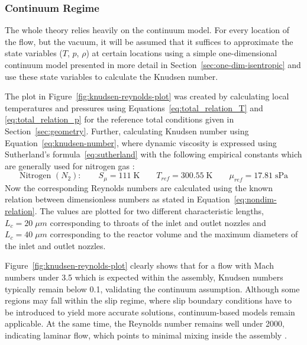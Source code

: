 \subsubsection*{Continuum Regime}
	The whole theory relies heavily on the continuum model.
	For every location of the flow, but the vacuum, it will be assumed that it suffices to approximate the state variables ($T$, $p$, $\rho$) at certain locations using a simple one-dimensional continuum model presented in more detail in Section~\ref{sec:one-dim-isentropic} and use these state variables to calculate the Knudsen number.

	The plot in Figure~\ref{fig:knudsen-reynolds-plot} was created by calculating local temperatures and pressures using Equations~\eqref{eq:total_relation_T} and \eqref{eq:total_relation_p} for the reference total conditions given in Section~\ref{sec:geometry}.
	Further, calculating Knudsen number using Equation~\eqref{eq:knudsen-number}, where dynamic viscosity is expressed using Sutherland's formula~\eqref{eq:sutherland} with the following empirical constants which are generally used for nitrogen gas \cite{kim2004numericalanalysisflowcharacteristics}:
	$$
		\text{Nitrogen }(N_2):
			\qquad
		S_\mu = 111\;\text{K}
			\qquad
		T_{ref} = 300.55\;\text{K}
			\qquad
		\mu_{ref} = 17.81\; \text{sPa}
	$$
	Now the corresponding Reynolds numbers are calculated using the known relation between dimensionless numbers as stated in Equation~\eqref{eq:nondim-relation}.
	The values are plotted for two different characteristic lengths, $L_c = 20\;\mu m$ corresponding to throats of the inlet and outlet nozzles and $L_c = 40\;\mu m$ corresponding to the reactor volume and the maximum diameters of the inlet and outlet nozzles.

	Figure~\ref{fig:knudsen-reynolds-plot} clearly shows that for a flow with Mach numbers under 3.5 which is expected within the assembly, Knudsen numbers typically remain below 0.1, validating the continuum assumption.
	Although some regions may fall within the slip regime, where slip boundary conditions have to be introduced to yield more accurate solutions, continuum-based models remain applicable. 
	At the same time, the Reynolds number remains well under 2000, indicating laminar flow, which points to minimal mixing inside the assembly \cite{ames1953compressible, comsol_microfluidics_guide}.
	\newpage


